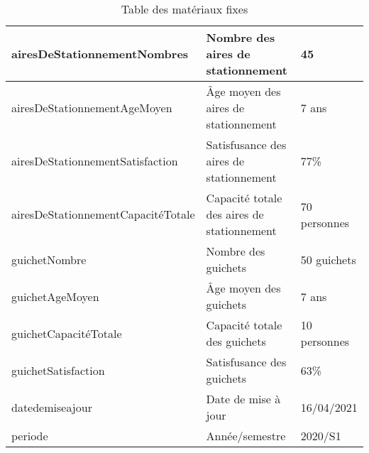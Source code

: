 \begin{table}[H]
\begin{center}
\begin{tabularx}{17.5cm}{|X|X|p{2.5cm}|}
				\hline
				airesDeStationnementNombres        & Nombre des aires de stationnement          & 45               \\
				\hline
				airesDeStationnementAgeMoyen       & Âge moyen des aires de stationnement       & 7 ans            \\
				\hline
				airesDeStationnementSatisfaction   & Satisfusance des aires de stationnement    & 77\%             \\
				\hline
				airesDeStationnementCapacitéTotale & Capacité totale des aires de stationnement & 70 personnes     \\
				\hline
				guichetNombre                      & Nombre des guichets                        & 50 guichets      \\
				\hline
				guichetAgeMoyen                    & Âge moyen des guichets                     & 7 ans            \\
				\hline
				guichetCapacitéTotale              & Capacité totale des guichets               & 10 personnes     \\
				\hline
				guichetSatisfaction                & Satisfusance des guichets                  & 63\%             \\
				\hline
				datedemiseajour                    & Date de mise à jour                        & 16/04/2021       \\
				\hline
				periode                            & Année/semestre                             & 2020/S1          \\
				\hline
			\end{tabularx}
			\caption{Table des matériaux fixes}
		\end{center}
	\end{table}

